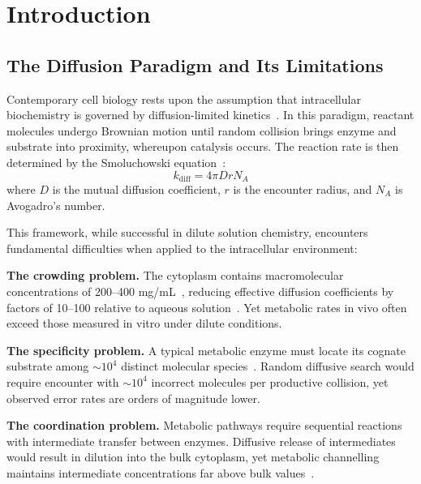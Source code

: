 \documentclass[twocolumn,10pt,aps,prd,superscriptaddress,floatfix,nofootinbib]{revtex4-2}
\theoremstyle{remark}
\begin{document}
\maketitle

\section{Introduction}
\label{sec:introduction}

\subsection{The Diffusion Paradigm and Its Limitations}

Contemporary cell biology rests upon the assumption that intracellular biochemistry is governed by diffusion-limited kinetics~\cite{Berg1993,Goodsell1991}. In this paradigm, reactant molecules undergo Brownian motion until random collision brings enzyme and substrate into proximity, whereupon catalysis occurs. The reaction rate is then determined by the Smoluchowski equation~\cite{Smoluchowski1917}:
\begin{equation}
k_{\mathrm{diff}} = 4\pi D r N_A
\label{eq:smoluchowski}
\end{equation}
where $D$ is the mutual diffusion coefficient, $r$ is the encounter radius, and $N_A$ is Avogadro's number.

This framework, while successful in dilute solution chemistry, encounters fundamental difficulties when applied to the intracellular environment:

\textbf{The crowding problem.} The cytoplasm contains macromolecular concentrations of 200--400 mg/mL~\cite{Ellis2001,Zimmerman1993}, reducing effective diffusion coefficients by factors of 10--100 relative to aqueous solution~\cite{Luby-Phelps2000}. Yet metabolic rates in vivo often exceed those measured in vitro under dilute conditions.

\textbf{The specificity problem.} A typical metabolic enzyme must locate its cognate substrate among $\sim 10^{4}$ distinct molecular species~\cite{Alberts2015}. Random diffusive search would require encounter with $\sim 10^{4}$ incorrect molecules per productive collision, yet observed error rates are orders of magnitude lower.

\textbf{The coordination problem.} Metabolic pathways require sequential reactions with intermediate transfer between enzymes. Diffusive release of intermediates would result in dilution into the bulk cytoplasm, yet metabolic channelling maintains intermediate concentrations far above bulk values~\cite{Sweetlove2018}.
\end{document}
